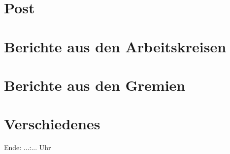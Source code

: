 \documentclass[a4paper,12pt]{article}
\begin{document}
\section{Post}

\section{Berichte aus den Arbeitskreisen}

\section{Berichte aus den Gremien}

\section{Verschiedenes}

\begin{center}
	{Ende: ...:... Uhr}
\end{center}
\label{EOD}
\end{document}

